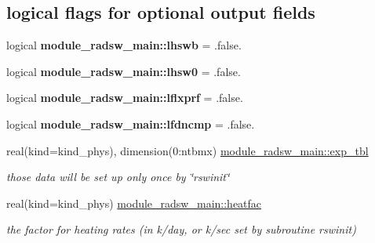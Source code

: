 \subsection*{logical flags for optional output fields}
\begin{DoxyCompactItemize}
\item 
\mbox{\label{group__module__radsw__main_ga08bfecbd5edb2ad3ba0ae836cfe18d05}} 
logical {\bfseries module\+\_\+radsw\+\_\+main\+::lhswb} = .false.
\item 
\mbox{\label{group__module__radsw__main_ga3fd8cae0d38772eea36ce6ec2d258997}} 
logical {\bfseries module\+\_\+radsw\+\_\+main\+::lhsw0} = .false.
\item 
\mbox{\label{group__module__radsw__main_gac4ab674edb40fda0c89aa8ee331ccdc6}} 
logical {\bfseries module\+\_\+radsw\+\_\+main\+::lflxprf} = .false.
\item 
\mbox{\label{group__module__radsw__main_ga8c0a241d6c1aa69fee4cd24fdbc4256b}} 
logical {\bfseries module\+\_\+radsw\+\_\+main\+::lfdncmp} = .false.
\item 
\mbox{\label{group__module__radsw__main_ga1f9d18b17cc24321ed1cf45254ac2b0f}} 
real(kind=kind\+\_\+phys), dimension(0\+:ntbmx) \hyperlink{group__module__radsw__main_ga1f9d18b17cc24321ed1cf45254ac2b0f}{module\+\_\+radsw\+\_\+main\+::exp\+\_\+tbl}
\begin{DoxyCompactList}\small\item\em those data will be set up only once by \char`\"{}rswinit\char`\"{} \end{DoxyCompactList}\item 
\mbox{\label{group__module__radsw__main_gaad60e753cdda20d4e84d063280f0dfcc}} 
real(kind=kind\+\_\+phys) \hyperlink{group__module__radsw__main_gaad60e753cdda20d4e84d063280f0dfcc}{module\+\_\+radsw\+\_\+main\+::heatfac}
\begin{DoxyCompactList}\small\item\em the factor for heating rates (in k/day, or k/sec set by subroutine \textquotesingle{}rswinit\textquotesingle{}) \end{DoxyCompactList}\item 

\end{DoxyCompactItemize}
